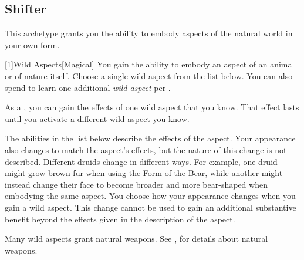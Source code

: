     \subsection{Shifter}\label{Shifter}
        This archetype grants you the ability to embody aspects of the natural world in your own form.

        [1]{Wild Aspects}[Magical]
        You gain the ability to embody an aspect of an animal or of nature itself.
        Choose a single wild aspect from the list below.
        You can also spend  to learn one additional \textit{wild aspect} per .

        As a , you can gain the effects of one wild aspect that you know.
        That effect lasts until you activate a different wild aspect you know.

        The abilities in the list below describe the effects of the aspect.
        Your appearance also changes to match the aspect's effects, but the nature of this change is not described.
        Different druids change in different ways.
        For example, one druid might grow brown fur when using the Form of the Bear, while another might instead change their face to become broader and more bear-shaped when embodying the same aspect.
        You choose how your appearance changes when you gain a wild aspect.
        This change cannot be used to gain an additional substantive benefit beyond the effects given in the description of the aspect.

        Many wild aspects grant natural weapons.
        See , for details about natural weapons.

